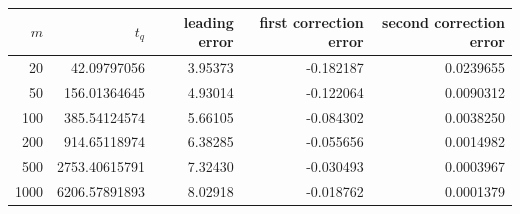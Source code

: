 \begin{tabular}{rrrrr}
\toprule
$m$ & $t_q$ & leading error & first correction error & second correction error\\
\midrule
20 & 42.09797056 & 3.95373 & -0.182187 & 0.0239655\\
50 & 156.01364645 & 4.93014 & -0.122064 & 0.0090312\\
100 & 385.54124574 & 5.66105 & -0.084302 & 0.0038250\\
200 & 914.65118974 & 6.38285 & -0.055656 & 0.0014982\\
500 & 2753.40615791 & 7.32430 & -0.030493 & 0.0003967\\
1000 & 6206.57891893 & 8.02918 & -0.018762 & 0.0001379\\
\bottomrule
\end{tabular}

